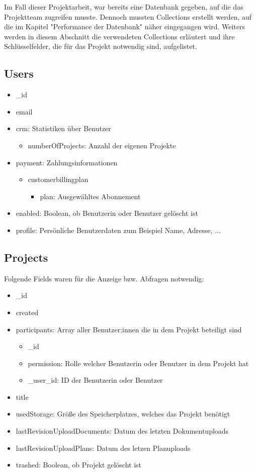 Im Fall dieser Projektarbeit, war bereits eine Datenbank gegeben, auf die das Projektteam zugreifen musste. Dennoch mussten Collections erstellt werden, auf die im Kapitel "Performance der Datenbank" näher eingegangen wird. Weiters werden in diesem Abschnitt die verwendeten Collections erläutert und ihre Schlüsselfelder, die für das Projekt notwendig sind, aufgelistet.
\subsection{Users}
\begin{itemize}
    \item \_id
    \item email
    \item crm: Statistiken über Benutzer
        \begin{itemize}
            \item numberOfProjects: Anzahl der eigenen Projekte
        \end{itemize}
    \item payment: Zahlungsinformationen
        \begin{itemize}
            \item customerbillingplan
            \begin{itemize}
                \item plan: Ausgewähltes Abonnement
            \end{itemize}
        \end{itemize}
    \item enabled: Boolean, ob Benutzerin oder Benutzer gelöscht ist
    \item profile: Persönliche Benutzerdaten zum Beispiel Name, Adresse, ...
\end{itemize}

\subsection{Projects}
Folgende Fields waren für die Anzeige bzw. Abfragen notwendig:
\begin{itemize}
    \item \_id
    \item created
    \item participants: Array aller Benutzer:innen die in dem Projekt beteiligt sind
        \begin{itemize}
            \item \_id
            \item permission: Rolle welcher Benutzerin oder Benutzer in dem Projekt hat
            \item \_user\_id: ID der Benutzerin oder Benutzer
        \end{itemize}
    \item title
    \item usedStorage: Größe des Speicherplatzes, welches das Projekt benötigt
    \item lastRevisionUploadDocuments: Datum des letzten Dokumentuploads
    \item lastRevisionUploadPlans: Datum des letzen Planuploads
    \item trashed: Boolean, ob Projekt gelöscht ist
\end{itemize}